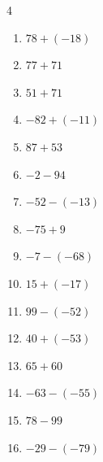 \begin{multicols}{4}
\begin{enumerate}
  \item $78+(-18)$

        \phantom{$=60$}

  \item $77+71$

        \phantom{$=148$}

  \item $51+71$

        \phantom{$=122$}

  \item $-82+(-11)$

        \phantom{$=-93$}

  \item $87+53$

        \phantom{$=140$}

  \item $-2-94$

        \phantom{$=-96$}

  \item $-52-(-13)$

        \phantom{$=-39$}

  \item $-75+9$

        \phantom{$=-66$}

  \item $-7-(-68)$

        \phantom{$=61$}

  \item $15+(-17)$

        \phantom{$=-2$}

  \item $99-(-52)$

        \phantom{$=151$}

  \item $40+(-53)$

        \phantom{$=-13$}

  \item $65+60$

        \phantom{$=125$}

  \item $-63-(-55)$

        \phantom{$=-8$}

  \item $78-99$

        \phantom{$=-21$}

  \item $-29-(-79)$

        \phantom{$=50$}


\end{enumerate}
\end{multicols}
